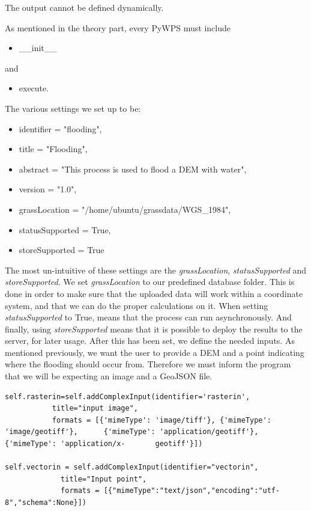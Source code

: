 The output cannot be defined dynamically. 

As mentioned in the theory part, every PyWPS must include 
\begin{itemize}
\item \_\_init\_\_ 
\end{itemize}
and 
\begin{itemize}
\item execute.
\end{itemize}
  
The various settings we set up to be:

\begin{itemize}
\item identifier = "flooding",
\item title = "Flooding",
\item abstract = "This process is used to flood a DEM with water",
\item version = "1.0",
\item grassLocation = "/home/ubuntu/grassdata/WGS\_1984",
\item statusSupported = True,
\item storeSupported = True
\end{itemize}

The most un-intuitive of these settings are the \textit{grassLocation}, \textit{statusSupported} and \textit{storeSupported}. 
We set \textit{grassLocation} to our predefined database folder. This is done in order to make sure that the uploaded data will work within a coordinate system, and that we can do the proper calculations on it.
When setting \textit{statusSupported} to True, means that the process can run asynchronously. 
And finally, using \textit{storeSupported} means that it is possible to deploy the results to the server, for later usage. 
After this has been set, we define the needed inputs. As mentioned previously, we want the user to provide a DEM and a point indicating where the flooding should occur from. Therefore we must inform the program that we will be expecting an image and a GeoJSON file. 

\begin{lstlisting}
self.rasterin=self.addComplexInput(identifier='rasterin',
		   title="input image",
	   	   formats = [{'mimeType': 'image/tiff'}, {'mimeType': 			             	'image/geotiff'}, 	   {'mimeType': 'application/geotiff'}, 		            {'mimeType': 'application/x-	   geotiff'}])
	   	   
self.vectorin = self.addComplexInput(identifier="vectorin",
		     title="Input point",
		     formats = [{"mimeType":"text/json","encoding":"utf-			              8","schema":None}])

\end{lstlisting}

